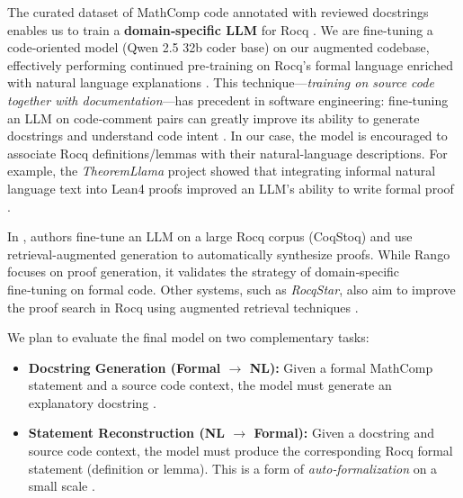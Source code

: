 \documentclass[11pt,a4paper]{article}
\begin{document}
The curated dataset of MathComp code annotated with reviewed docstrings enables us to train a \textbf{domain‑specific LLM} for Rocq \cite{florath2024coqlm,chakrabarty2024codedoc}. We are fine‑tuning a code‑oriented model \cite{qwen25coder} (Qwen 2.5 32b coder base) on our augmented codebase, effectively performing continued pre‑training on Rocq's formal language enriched with natural language explanations \cite{wang2024theoremllama,song2025leancopilot}. This technique—\emph{training on source code together with documentation}—has precedent in software engineering: fine‑tuning an LLM on code‑comment pairs can greatly improve its ability to generate docstrings and understand code intent \cite{docstring_findings}. In our case, the model is encouraged to associate Rocq definitions/lemmas with their natural‑language descriptions. For example, the \emph{TheoremLlama} project showed that integrating informal natural language text into Lean4 proofs improved an LLM's ability to write formal proof \cite{wang2024theoremllama}.

In \cite{thompson2025rango}, authors fine-tune an LLM on a large Rocq corpus (CoqStoq) and use retrieval-augmented generation to automatically synthesize proofs. While Rango focuses on proof generation, it validates the strategy of domain‑specific fine‑tuning on formal code. Other systems, such as \emph{RocqStar}, also aim to improve the proof search in Rocq using augmented retrieval techniques \cite{kozyrev2025rocqstar}.

We plan to evaluate the final model on two complementary tasks: \begin{itemize}[leftmargin=1.5em] \item \textbf{Docstring Generation (Formal $\rightarrow$ NL):} Given a formal MathComp statement and a source code context, the model must generate an explanatory docstring \cite{chakrabarty2024codedoc}. \item \textbf{Statement Reconstruction (NL $\rightarrow$ Formal):} Given a docstring and source code context, the model must produce the corresponding Rocq formal statement (definition or lemma). This is a form of \emph{auto‑formalization} on a small scale \cite{lu2025autoformalization}. \end{itemize}
\end{document}
